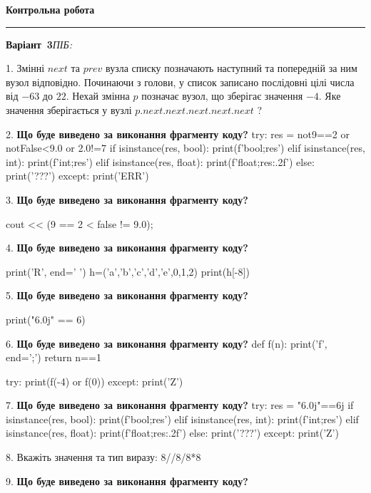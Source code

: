 \documentclass[11pt]{article}
\begin{document}
\newpage

\newpage

{\centering\Large\bfseries Контрольна робота\par}
\medskip
\noindent\rule{\linewidth}{0.5pt}
\smallskip
\noindent\textbf{Варіант \No\,3}\hfill \textit{ПІБ:}\,\underline{\hspace{60mm}}
\vspace{4mm}

1. 
Змінні $next$ та $prev$ вузла списку позначають наступний та попередній за ним вузол відповідно. Починаючи з голови, у список записано послідовні цілі числа від $-63$ до $22$. Нехай змінна $p$ позначає вузол, що зберігає значення $-4$.
Яке значення зберігається у вузлі $p.next.next.next.next.next$ ?
\par\vspace{5mm}
2. \textbf{Що буде виведено за виконання фрагменту коду?}
try:
    res = not9==2 or notFalse<9.0 or 2.0!=7
    if isinstance(res, bool):
        print(f'bool;{res}')
    elif isinstance(res, int):
        print(f'int;{res}')
    elif isinstance(res, float):
        print(f'float;{res:.2f}')
    else:
        print('???')
except:
    print('ERR')
\par\vspace{5mm}
3. \textbf{Що буде виведено за виконання фрагменту коду?}

cout << (9 == 2 < false != 9.0);
\par\vspace{5mm}
4. \textbf{Що буде виведено за виконання фрагменту коду?}

print('R', end=' ')
h=('a','b','c','d','e',0,1,2)
print(h[-8])

\par\vspace{5mm}
5. \textbf{Що буде виведено за виконання фрагменту коду?}

print("6.0j" == 6)
\par\vspace{5mm}
6. \textbf{Що буде виведено за виконання фрагменту коду?}
def f(n):
    print('f', end=';')
    return n==1

try:
    print(f(-4) or f(0))
except:
    print('Z')
\par\vspace{5mm}
7. \textbf{Що буде виведено за виконання фрагменту коду?}
try:
    res = "6.0j"==6j
    if isinstance(res, bool):
        print(f'bool;{res}')
    elif isinstance(res, int):
        print(f'int;{res}')
    elif isinstance(res, float):
        print(f'float;{res:.2f}')
    else:
        print('???')
except:
    print('Z')
\par\vspace{5mm}
8. 
Вкажіть значення та тип виразу:
8//8/8*8
\par\vspace{5mm}
9. \textbf{Що буде виведено за виконання фрагменту коду?}
\end{document}
